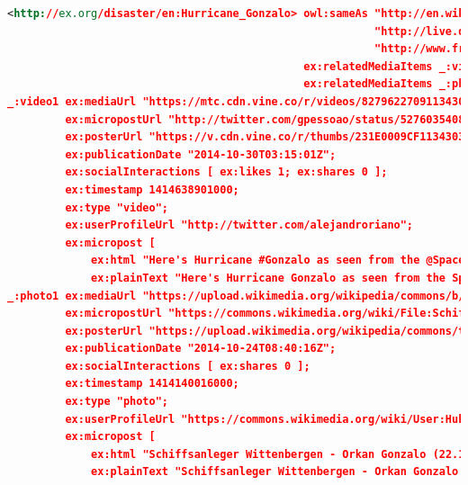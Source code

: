 \documentclass[letterpaper]{article}
\begin{document}
\begin{lstlisting}[caption={Exemplary Linked Data for \emph{Hurricane Gonzalo} using a~yet to-be-defined vocabulary
  (potentially HXL \url{http://hxl.humanitarianresponse.info/ns/index.html} or MOAC
  \url{http://observedchange.com/moac/ns/})
  that interlinks the disaster with several other Linked Data sources and relates it to
  multimedia content on online social networking sites},
  label=listing:linkeddata,language=xml,float=*t, stringstyle=\color{gray}]
<http://ex.org/disaster/en:Hurricane_Gonzalo> owl:sameAs "http://en.wikipedia.org/wiki/Hurricane_Gonzalo",
                                                         "http://live.dbpedia.org/page/Hurricane_Gonzalo",
                                                         "http://www.freebase.com/m/0123kcg5";
                                              ex:relatedMediaItems _:video1;
                                              ex:relatedMediaItems _:photo1;
_:video1 ex:mediaUrl "https://mtc.cdn.vine.co/r/videos/82796227091134303173323251712_2ca88ba5444.5.1.16698738182474199804.mp4";
         ex:micropostUrl "http://twitter.com/gpessoao/status/527603540860997632";
         ex:posterUrl "https://v.cdn.vine.co/r/thumbs/231E0009CF1134303174572797952_2.5.1.16698738182474199804.mp4.jpg";
         ex:publicationDate "2014-10-30T03:15:01Z";
         ex:socialInteractions [ ex:likes 1; ex:shares 0 ];
         ex:timestamp 1414638901000;
         ex:type "video";
         ex:userProfileUrl "http://twitter.com/alejandroriano";
         ex:micropost [
             ex:html "Here's Hurricane #Gonzalo as seen from the @Space_Station as it orbited above today https://t.co/RpJt0P2bXa";
             ex:plainText "Here's Hurricane Gonzalo as seen from the Space_Station as it orbited above today" ].
_:photo1 ex:mediaUrl "https://upload.wikimedia.org/wikipedia/commons/b/bb/Schiffsanleger_Wittenbergen_-_Orkan_Gonzalo.jpg";
         ex:micropostUrl "https://commons.wikimedia.org/wiki/File:Schiffsanleger_Wittenbergen_-_Orkan_Gonzalo_(22.10.2014)_01.jpg";
         ex:posterUrl "https://upload.wikimedia.org/wikipedia/commons/thumb/b/bb/Schiffsanleger_Wittenbergen_-_Orkan_Gonzalo_%2822.10.2014%29_01.jpg/500px-Schiffsanleger_Wittenbergen_-_Orkan_Gonzalo_(22.10.2014)_01.jpg" .
         ex:publicationDate "2014-10-24T08:40:16Z";
         ex:socialInteractions [ ex:shares 0 ];
         ex:timestamp 1414140016000;
         ex:type "photo";
         ex:userProfileUrl "https://commons.wikimedia.org/wiki/User:Huhu Uet";
         ex:micropost [
             ex:html "Schiffsanleger Wittenbergen - Orkan Gonzalo (22.10.2014) 01";
             ex:plainText "Schiffsanleger Wittenbergen - Orkan Gonzalo (22.10.2014) 01" ].
\end{lstlisting}
\end{document}
